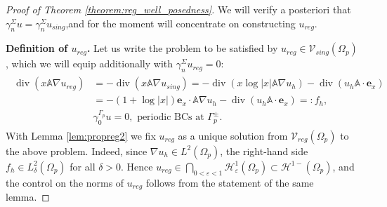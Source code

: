 \documentclass[report]{elsarticle}
\numberwithin{theorem}{section}
\renewcommand{\vec}[1]{\mathbf{#1}}
\newcommand{\re}{\varepsilon}
\begin{document}
\begin{proof}[Proof of Theorem \ref{theorem:reg_well_posedness}]
	We will verify a posteriori that $\gamma_n^{\Sigma}u=\gamma_n^{\Sigma}u_{sing}$,and for the moment will concentrate on constructing $u_{reg}$.  
	
	
	\textbf{Definition of $u_{reg}$. }	Let us write the problem to be satisfied by $u_{reg}\in \mathcal{V}_{sing}(\Omega_p)$, which we will equip additionally with $\gamma_n^{\Sigma}u_{reg}=0$:
	\begin{align}
		\label{eq:uregpb}
		\begin{split}
			\operatorname{div}(x\mathbb{A}\nabla u_{reg})&=-\operatorname{div}(x\mathbb{A}\nabla u_{sing})=-\operatorname{div}(x\log|x|\mathbb{A}\nabla u_h)-\operatorname{div}(u_h\mathbb{A}\cdot\vec{e}_x)\\
			&=-(1+\log|x|)\vec{e}_x\cdot \mathbb{A}\nabla u_h -\operatorname{div}(u_h\mathbb{A}\cdot\vec{e}_x)=:f_h,\\
			&\gamma_0^{\Gamma_p}u=0,\text{  periodic BCs at }\Gamma^{\pm}_p.
		\end{split}
	\end{align}
	With Lemma \ref{lem:propreg2} we fix $u_{reg}$ as a unique solution from $\mathcal{V}_{reg}(\Omega_p)$ to the above problem. Indeed, since $\nabla u_h\in L^2(\Omega_p)$, the right-hand side $f_h\in L^2_{\delta}(\Omega_p)$ for all $\delta>0$. Hence $u_{reg}\in \bigcap_{0<\re<1}\mathcal{H}^{1}_{\re}(\Omega_p)\subset\mathcal{H}^{1-}(\Omega_p)$, and the control on the norms of $u_{reg}$ follows from the statement of the same lemma. 
	

\end{proof}
\end{document}
